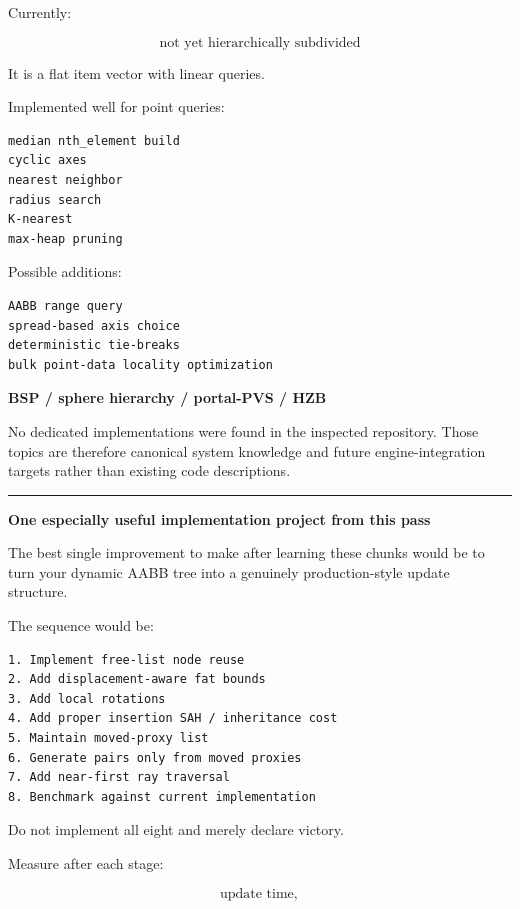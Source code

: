 \textbf{}

Currently:

\[
\boxed{\text{not yet hierarchically subdivided}}
\]

It is a flat item vector with linear queries.

\textbf{}

Implemented well for point queries:

\begin{verbatim}
median nth_element build
cyclic axes
nearest neighbor
radius search
K-nearest
max-heap pruning
\end{verbatim}

Possible additions:

\begin{verbatim}
AABB range query
spread-based axis choice
deterministic tie-breaks
bulk point-data locality optimization
\end{verbatim}

\textbf{BSP / sphere hierarchy / portal-PVS / HZB}

No dedicated implementations were found in the inspected  repository. Those topics are therefore canonical system knowledge and future engine-integration targets rather than existing code descriptions.

\begin{center}\rule{0.5\linewidth}{0.5pt}\end{center}

\textbf{One especially useful implementation project from this pass}

The best single improvement to make after learning these chunks would be to turn your dynamic AABB tree into a genuinely production-style update structure.

The sequence would be:

\begin{verbatim}
1. Implement free-list node reuse
2. Add displacement-aware fat bounds
3. Add local rotations
4. Add proper insertion SAH / inheritance cost
5. Maintain moved-proxy list
6. Generate pairs only from moved proxies
7. Add near-first ray traversal
8. Benchmark against current implementation
\end{verbatim}

Do not implement all eight and merely declare victory.

Measure after each stage:

\[
\text{update time},
\]

